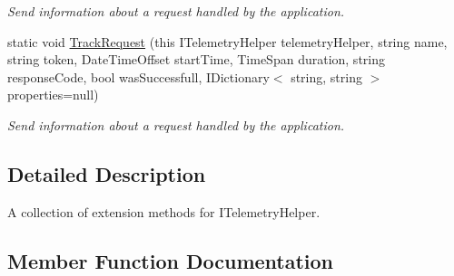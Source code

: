 \begin{DoxyCompactItemize}
\begin{DoxyCompactList}\small\item\em Send information about a request handled by the application. \end{DoxyCompactList}\item 
static void \hyperlink{classCqrs_1_1Configuration_1_1ITelemetryHelperExtensions_aba815675738eed8509d2ad4d327b591d_aba815675738eed8509d2ad4d327b591d}{Track\+Request} (this I\+Telemetry\+Helper telemetry\+Helper, string name, string token, Date\+Time\+Offset start\+Time, Time\+Span duration, string response\+Code, bool was\+Successfull, I\+Dictionary$<$ string, string $>$ properties=null)
\begin{DoxyCompactList}\small\item\em Send information about a request handled by the application. \end{DoxyCompactList}\end{DoxyCompactItemize}


\subsection{Detailed Description}
A collection of extension methods for I\+Telemetry\+Helper. 



\subsection{Member Function Documentation}
\mbox{\label{classCqrs_1_1Configuration_1_1ITelemetryHelperExtensions_a8e248c0990f9abd8f9d7f06a6e82c1d6_a8e248c0990f9abd8f9d7f06a6e82c1d6}} 
